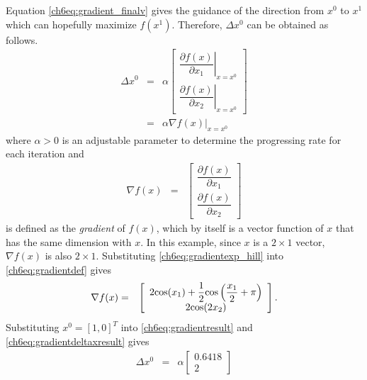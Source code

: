 Equation \eqref{ch6eq:gradient_finalv} gives the guidance of the direction from $x^0$ to $x^{1}$ which can hopefully maximize $f(x^1)$. Therefore, $\Delta x^0$ can be obtained as follows.
\begin{eqnarray}
  \Delta x^0 &=& \alpha \left[\begin{array}{c}
                         \left.\dfrac{\partial f(x)}{\partial x_1}\right|_{x=x^0} \\
                         \left.\dfrac{\partial f(x)}{\partial x_2}\right|_{x=x^0}
                       \end{array}\right] \nonumber \\
  &=& \alpha \left.\nabla f(x)\right|_{x=x^0} \label{ch6eq:gradientdeltaxresult}
\end{eqnarray}
where $\alpha > 0$ is an adjustable parameter to determine the progressing rate for each iteration and
\begin{eqnarray}
  \nabla f(x) &=& \left[\begin{array}{c}
                         \dfrac{\partial f(x)}{\partial x_1} \\
                         \dfrac{\partial f(x)}{\partial x_2}
                       \end{array}\right] \label{ch6eq:gradientdef}
\end{eqnarray}
is defined as the \textit{gradient} of $f(x)$, which by itself is a vector function of $x$ that has the same dimension with $x$. In this example, since $x$ is a $2\times 1$ vector, $\nabla f(x)$ is also $2 \times 1$. Substituting \eqref{ch6eq:gradientexp_hill} into \eqref{ch6eq:gradientdef} gives
\begin{eqnarray}
  \nabla f(x) &=& \left[\begin{array}{c}
                         2\textup{cos}(x_1) + \dfrac{1}{2}\textup{cos}\left(\dfrac{x_1}{2}+\pi\right) \\
                         2\textup{cos}(2x_2)
                       \end{array}\right]. \label{ch6eq:gradientresult}
\end{eqnarray}
Substituting $x^0=[1,0]^T$ into \eqref{ch6eq:gradientresult} and \eqref{ch6eq:gradientdeltaxresult} gives
\begin{eqnarray}
  \Delta x^0 &=& \alpha \left[\begin{array}{c}
                         0.6418 \\
                         2
                       \end{array}\right] \nonumber
\end{eqnarray}


